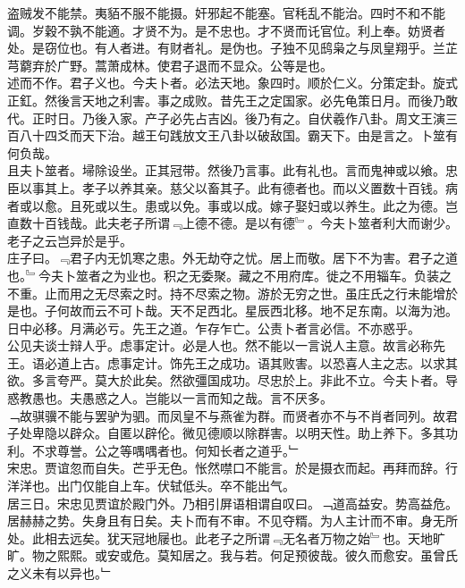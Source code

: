 \documentclass{zhvt-classic}
\begin{document}
\hspace*{2em}盗贼发不能禁。夷貊不服不能摄。奸邪起不能塞。官秏乱不能治。四时不和不能调。岁穀不孰不能適。才贤不为。是不忠也。才不贤而讬官位。利上奉。妨贤者处。是窃位也。有人者进。有财者礼。是伪也。子独不见鸱枭之与凤皇翔乎。兰芷芎藭弃於广野。蒿萧成林。使君子退而不显众。公等是也。\\
\hspace*{2em}述而不作。君子义也。今夫卜者。必法天地。象四时。顺於仁义。分策定卦。旋式正釭。然後言天地之利害。事之成败。昔先王之定国家。必先龟策日月。而後乃敢代。正时日。乃後入家。产子必先占吉凶。後乃有之。自伏羲作八卦。周文王演三百八十四爻而天下治。越王句践放文王八卦以破敌国。霸天下。由是言之。卜筮有何负哉。\\
\hspace*{2em}且夫卜筮者。埽除设坐。正其冠带。然後乃言事。此有礼也。言而鬼神或以飨。忠臣以事其上。孝子以养其亲。慈父以畜其子。此有德者也。而以义置数十百钱。病者或以愈。且死或以生。患或以免。事或以成。嫁子娶妇或以养生。此之为德。岂直数十百钱哉。此夫老子所谓﹃上德不德。是以有德﹄。今夫卜筮者利大而谢少。老子之云岂异於是乎。\\
\hspace*{2em}庄子曰。﹃君子内无饥寒之患。外无劫夺之忧。居上而敬。居下不为害。君子之道也。﹄今夫卜筮者之为业也。积之无委聚。藏之不用府库。徙之不用辎车。负装之不重。止而用之无尽索之时。持不尽索之物。游於无穷之世。虽庄氏之行未能增於是也。子何故而云不可卜哉。天不足西北。星辰西北移。地不足东南。以海为池。日中必移。月满必亏。先王之道。乍存乍亡。公责卜者言必信。不亦惑乎。\\
\hspace*{2em}公见夫谈士辩人乎。虑事定计。必是人也。然不能以一言说人主意。故言必称先王。语必道上古。虑事定计。饰先王之成功。语其败害。以恐喜人主之志。以求其欲。多言夸严。莫大於此矣。然欲彊国成功。尽忠於上。非此不立。今夫卜者。导惑教愚也。夫愚惑之人。岂能以一言而知之哉。言不厌多。\\
\hspace*{2em}﹁故骐骥不能与罢驴为驷。而凤皇不与燕雀为群。而贤者亦不与不肖者同列。故君子处卑隐以辟众。自匿以辟伦。微见德顺以除群害。以明天性。助上养下。多其功利。不求尊誉。公之等喁喁者也。何知长者之道乎。﹂\\
\hspace*{2em}宋忠。贾谊忽而自失。芒乎无色。怅然噤口不能言。於是摄衣而起。再拜而辞。行洋洋也。出门仅能自上车。伏轼低头。卒不能出气。\\
\hspace*{2em}居三日。宋忠见贾谊於殿门外。乃相引屏语相谓自叹曰。﹁道高益安。势高益危。居赫赫之势。失身且有日矣。夫卜而有不审。不见夺糈。为人主计而不审。身无所处。此相去远矣。犹天冠地屦也。此老子之所谓﹃无名者万物之始﹄也。天地旷旷。物之熙熙。或安或危。莫知居之。我与若。何足预彼哉。彼久而愈安。虽曾氏之义未有以异也。﹂\\
\end{document}
